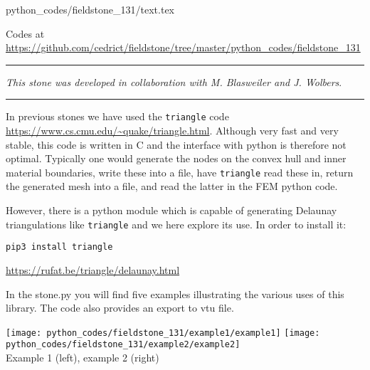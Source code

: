 \begin{flushright} {\tiny {\color{gray} python\_codes/fieldstone\_131/text.tex}} \end{flushright}

%

\begin{center}

Codes at \url{https://github.com/cedrict/fieldstone/tree/master/python_codes/fieldstone_131}
\end{center}

\par\noindent\rule{\textwidth}{0.4pt}

{\sl This stone was developed in collaboration with M. Blasweiler and J. Wolbers}. 

\par\noindent\rule{\textwidth}{0.4pt}

In previous stones we have used the {\tt triangle} code \url{https://www.cs.cmu.edu/~quake/triangle.html}.
Although very fast and very stable, this code is written in C and the interface with python 
is therefore not optimal. Typically one would generate the nodes on the convex hull and inner 
material boundaries, write these into a file, have {\tt triangle} read these in, return the 
generated mesh into a file, and read the latter in the FEM python code. 

However, there is a python module which is capable of generating Delaunay triangulations like {\tt triangle}
and we here explore its use. In order to install it:
\begin{verbatim}
pip3 install triangle
\end{verbatim}

\url{https://rufat.be/triangle/delaunay.html}

In the {\python stone.py} you will find five examples illustrating the various 
uses of this library. The code also provides an export to vtu file. 


\begin{center}
\texttt{[image: python\_codes/fieldstone\_131/example1/example1]}
\texttt{[image: python\_codes/fieldstone\_131/example2/example2]}\\
{\captionfont Example 1 (left), example 2 (right)}
\end{center}


